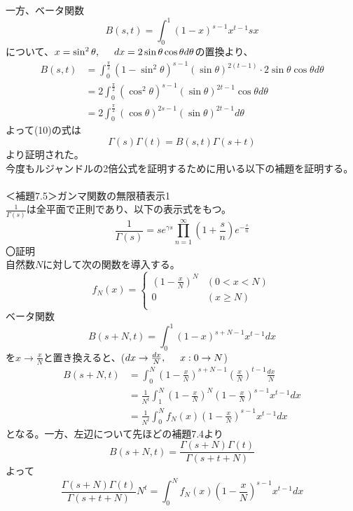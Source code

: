 \documentclass{jsarticle}
\begin{document}
一方、ベータ関数
\[B(s,t)=\int_{0}^{1}(1-x)^{s-1}x^{t-1}sx\]
について、\(x=\sin^{2}\theta,\hspace{5mm}dx=2\sin\theta\cos\theta d\theta\)の置換より、
\begin{align*}
B(s,t)&=\int_{0}^{\frac{\pi}{2}}(1-\sin^{2}\theta)^{s-1}(\sin\theta)^{2(t-1)}\cdot2\sin\theta\cos\theta d\theta\\
&=2\int_{0}^{\frac{\pi}{2}}(\cos^{2}\theta)^{s-1}(\sin\theta)^{2t-1}\cos\theta d\theta\\
&=2\int_{0}^{\frac{\pi}{2}}(\cos\theta)^{2s-1}(\sin\theta)^{2t-1}d\theta
\end{align*}
よって(10)の式は
\[\Gamma(s)\Gamma(t)=B(s,t)\Gamma(s+t)\]
より証明された。\\
今度もルジャンドルの2倍公式を証明するために用いる以下の補題を証明する。\\
\\
＜補題7.5＞ガンマ関数の無限積表示1\\
\(\frac{1}{\Gamma(s)}\)は全平面で正則であり、以下の表示式をもつ。
\begin{equation}
\frac{1}{\Gamma(s)}=se^{\gamma s}\prod_{n=1}^{\infty}\left(1+\frac{s}{n}\right)e^{-\frac{s}{n}}
\end{equation}
〇証明\\
自然数\(N\)に対して次の関数を導入する。
\[
f_{N}(x)=\begin{cases}
\left(1-\frac{x}{N}\right)^{N} & (0<x<N)\\
0 & (x\geq N)\\
\end{cases}
\]
ベータ関数
\[B(s+N,t)=\int_{0}^{1}(1-x)^{s+N-1}x^{t-1}dx\]
を\(x\to\frac{x}{N}\)と置き換えると、(\(dx\to\frac{dx}{N},\hspace{5mm}x:0\to N\))
\begin{align*}
B(s+N,t)&=\int_{0}^{N}\left(1-\frac{x}{N}\right)^{s+N-1}\left(\frac{x}{N}\right)^{t-1}\frac{dx}{N}\\
&=\frac{1}{N^t}\int_{1}^{N}\left(1-\frac{x}{N}\right)^{N}\left(1-\frac{x}{N}\right)^{s-1}x^{t-1}dx\\
&=\frac{1}{N^t}\int_{0}^{N}f_{N}(x)\left(1-\frac{x}{N}\right)^{s-1}x^{t-1}dx
\end{align*}
となる。一方、左辺について先ほどの補題7.4より
\[B(s+N,t)=\frac{\Gamma(s+N)\Gamma(t)}{\Gamma(s+t+N)}\]
よって
\begin{equation}
\frac{\Gamma(s+N)\Gamma(t)}{\Gamma(s+t+N)}N^t=\int_{0}^{N}f_{N}(x)\left(1-\frac{x}{N}\right)^{s-1}x^{t-1}dx
\end{equation}
\end{document}
